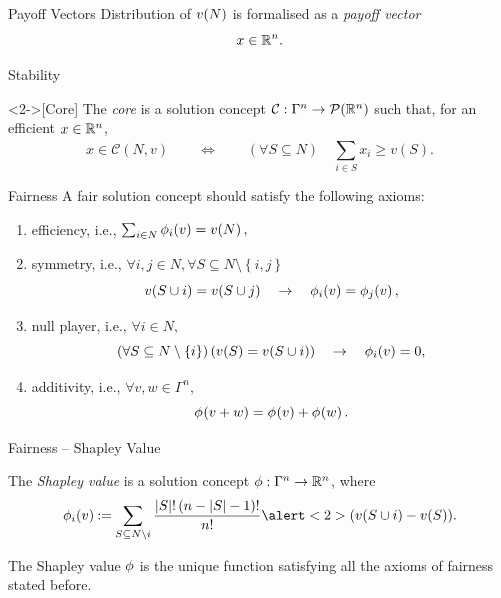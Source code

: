 \documentclass[aspectratio=169]{beamer}
\begin{document}
\begin{frame}{Payoff Vectors}
	Distribution of $ \fce{v}{N} $ is formalised as a \emph{payoff vector}
	\[
		x \in \R^n.
	\]


\end{frame}

\begin{frame}{Stability}
	\begin{definition}<2->[Core]
		The \emph{core} is a solution concept $ \mathcal{C}: \Gamma^n \to \pot {\R^n} $ such that, for an efficient $ x \in \R^n $, \[
			x \in \mathcal{C}(N,v) \qquad \iff \qquad \left( \forall S \subseteq N \right)\quad \sum_{i \in S}^{} x_i \geq v(S).
		\]
	\end{definition}
\end{frame}

\begin{frame}{Fairness}
	A fair solution concept should satisfy the following axioms:
	\begin{enumerate}
		\item<2-> efficiency, i.e., $\sum_{i \in N}^{} \shapley[i]{v} = \fce{v}{N},$
		\item<3-> symmetry, i.e., $  \forall i,j \in N, \forall S \subseteq N \setminus \left\{ i,j \right\} $\[
				 \fce{v}{S \cup i} = \fce{v}{S \cup j} \quad\implies\quad \shapley[i]{v} = \shapley[j]{v} ,
			\]
		\item<4-> null player, i.e., $ \forall i \in N,  $
			\[
				\left(  \forall S \subseteq N \setminus \left\{ i \right\} \right)\left(  \fce{v}{S} = \fce{v}{S \cup i} \right) \quad \implies \quad \shapley[i]{v} = 0,
			\]
		\item<5-> additivity, i.e., $ \forall v,w \in \Gamma^ n, $
			\[
				\shapley{v + w} = \shapley{v} + \shapley{w}.
			\]
	\end{enumerate}
\end{frame}

\begin{frame}{Fairness -- Shapley Value}
	\begin{definition}
		The \emph{Shapley value} is a solution concept $ \Shapley: \Gamma^n \to \R^n $, where \[
			\shapley[i]v \deq \sum_{S \subseteq N \setminus i}^{} \frac{\absolute S! \left( n-\absolute S-1 \right)!}{n!} \alert<2>{\left( \fce{v}{S \cup i} - \fce{v}{S} \right)}.
		\]
	\end{definition}

	\begin{theorem}[Shapley]
		The Shapley value $ \Shapley $ is the \alert<1>{unique} function satisfying all the axioms of fairness stated before.
	\end{theorem}
\end{frame}
\end{document}
